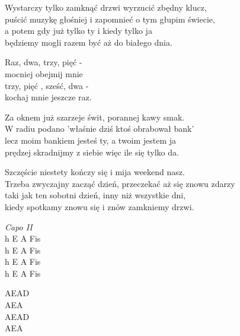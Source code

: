 \begin{text}

    Wystarczy tylko zamknąć drzwi wyrzucić zbędny klucz,\\
    puścić muzykę głośniej i zapomnieć o tym głupim świecie,\\
    a potem gdy już tylko ty i kiedy tylko ja\\
    będziemy mogli razem być aż do białego dnia.

    Raz, dwa, trzy, pięć - \\
    mocniej obejmij mnie\\
    trzy, pięć , sześć, dwa -\\
    kochaj mnie jeszcze raz.

    Za oknem już szarzeje świt, porannej kawy smak.\\
    W radiu podano 'właśnie dziś ktoś obrabował bank'\\
    lecz moim bankiem jesteś ty, a twoim jestem ja\\
    prędzej skradnijmy z siebie więc ile się tylko da.

    Szczęście niestety kończy się i mija weekend nasz.\\
    Trzeba zwyczajny zacząć dzień, przeczekać aż się znowu zdarzy\\
    taki jak ten sobotni dzień, inny niż wszystkie dni,\\
    kiedy spotkamy znowu się i znów zamkniemy drzwi.
    
\end{text}
\begin{chord}
    \small{
    \textit{Capo II}\\
    h E A Fis\\
    h E A Fis\\
    h E A Fis\\
    h E A Fis

    AEAD\\
    AEA\\
    AEAD\\
    AEA
    }
\end{chord}